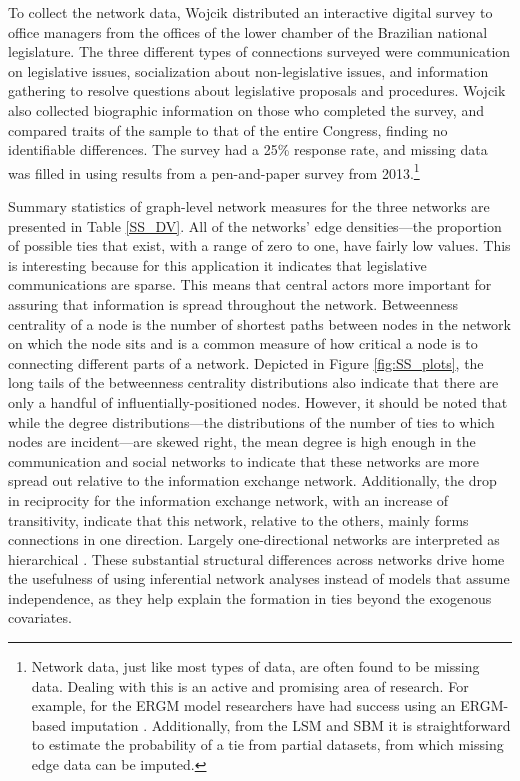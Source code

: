 \documentclass[fleqn,12pt]{wlscirep}
\begin{document}
To collect the network data, Wojcik distributed an interactive digital survey to office managers from the offices of the lower chamber of the Brazilian national legislature. The three different types of connections surveyed were communication on legislative issues, socialization about non-legislative issues, and information gathering to resolve questions about legislative proposals and procedures. Wojcik also collected biographic information on those who completed the survey, and compared traits of the sample to that of the entire Congress, finding no identifiable differences. The survey had a 25\% response rate, and missing data was filled in using results from a pen-and-paper survey from 2013.\footnote{Network data, just like most types of data, are often found to be missing data. Dealing with this is an active and promising area of research. For example, for the ERGM model researchers have had success using an ERGM-based imputation \citep{wang2016multiple}. Additionally, from the LSM and SBM it is straightforward to estimate the probability of a tie from partial datasets, from which missing edge data can be imputed.}

Summary statistics of graph-level network measures for the three networks are presented in Table \ref{SS_DV}. All of the networks' edge densities---the proportion of possible ties that exist, with a range of zero to one, have fairly low values. This is interesting because for this application it indicates that legislative communications are sparse. This means that central actors more important for assuring that information is spread throughout the network. Betweenness centrality of a node is the number of shortest paths between nodes in the network on which the node sits \citep{zhu2010visualization} and is a common measure of how critical a node is to connecting different parts of a network. Depicted in Figure \ref{fig:SS_plots}, the long tails of the betweenness centrality distributions also indicate that there are only a handful of influentially-positioned nodes.  However, it should be noted that while the degree distributions---the distributions of the number of ties to which nodes are incident---are skewed right, the mean degree is high enough in the communication and social networks to indicate that these networks are more spread out relative to the information exchange network. Additionally, the drop in reciprocity for the information exchange network, with an increase of transitivity, indicate that this network, relative to the others, mainly forms connections in one direction. Largely one-directional networks are interpreted as hierarchical \citep{liu2012control}. These substantial structural differences across networks drive home the usefulness of using inferential network analyses instead of models that assume independence, as they help explain the formation in ties beyond the exogenous covariates.
\end{document}

